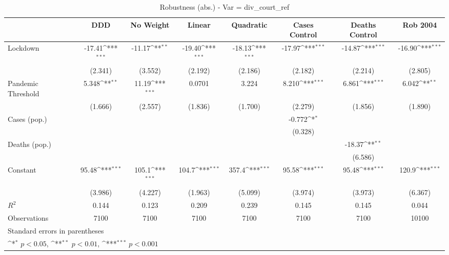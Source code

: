 \documentclass{article}
\begin{document}
{
\def\sym#1{\ifmmode^{#1}\else\(^{#1}\)\fi}
\begin{longtable}{l*{7}{c}}
\caption{Robustness (abs.) - Var = div\_court\_ref}\\
\hline\hline\endfirsthead\hline\endhead\hline\endfoot\endlastfoot
                &\multicolumn{1}{c}{DDD}&\multicolumn{1}{c}{No Weight}&\multicolumn{1}{c}{Linear}&\multicolumn{1}{c}{Quadratic}&\multicolumn{1}{c}{Cases Control}&\multicolumn{1}{c}{Deaths Control}&\multicolumn{1}{c}{Rob 2004}\\
\hline
Lockdown        &   -17.41\sym{***}&   -11.17\sym{**} &   -19.40\sym{***}&   -18.13\sym{***}&   -17.97\sym{***}&   -14.87\sym{***}&   -16.90\sym{***}\\
                &  (2.341)         &  (3.552)         &  (2.192)         &  (2.186)         &  (2.182)         &  (2.214)         &  (2.805)         \\
Pandemic Threshold&    5.348\sym{**} &    11.19\sym{***}&   0.0701         &    3.224         &    8.210\sym{***}&    6.861\sym{***}&    6.042\sym{**} \\
                &  (1.666)         &  (2.557)         &  (1.836)         &  (1.700)         &  (2.279)         &  (1.856)         &  (1.890)         \\
Cases (pop.)    &                  &                  &                  &                  &   -0.772\sym{*}  &                  &                  \\
                &                  &                  &                  &                  &  (0.328)         &                  &                  \\
Deaths (pop.)   &                  &                  &                  &                  &                  &   -18.37\sym{**} &                  \\
                &                  &                  &                  &                  &                  &  (6.586)         &                  \\
Constant        &    95.48\sym{***}&    105.1\sym{***}&    104.7\sym{***}&    357.4\sym{***}&    95.58\sym{***}&    95.48\sym{***}&    120.9\sym{***}\\
                &  (3.986)         &  (4.227)         &  (1.963)         &  (5.099)         &  (3.974)         &  (3.973)         &  (6.367)         \\
\hline
\(R^{2}\)       &    0.144         &    0.123         &    0.209         &    0.239         &    0.145         &    0.145         &    0.044         \\
Observations    &     7100         &     7100         &     7100         &     7100         &     7100         &     7100         &    10100         \\
\hline\hline
\multicolumn{8}{l}{\footnotesize Standard errors in parentheses}\\
\multicolumn{8}{l}{\footnotesize \sym{*} \(p<0.05\), \sym{**} \(p<0.01\), \sym{***} \(p<0.001\)}\\
\end{longtable}
}
\end{document}
